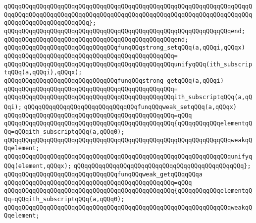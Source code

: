 \verb|qQQqqQQqqQQqqQQqqQQqqQQqqQQqqQQqqQQqqQQqqQQqqQQqqQQqqQQqqQQqqQQqqQQqqQQqqQQqqQQqqQQqqQQqqQQqqQQqqQQqqQQqqQQqqQQqqQQqqQQqqQQqqQQqqQQqqQQqqQQqqQQqqQQqqQQqqQQqqQQqqQQq};|\newline
\verb|qQQqqQQqqQQqqQQqqQQqqQQqqQQqqQQqqQQqqQQqqQQqqQQqqQQqqQQqqQQqqQQqend;|\newline
\verb|qQQqqQQqqQQqqQQqqQQqqQQqqQQqqQQqqQQqqQQqqQQqqQQqend;|\newline
\newline
\verb|qQQqqQQqqQQqqQQqqQQqqQQqqQQqqQQqfunqQQqstrong_setqQQq(a,qQQqi,qQQqx)|\newline
\verb|qQQqqQQqqQQqqQQqqQQqqQQqqQQqqQQqqQQqqQQqqQQqqQQq=|\newline
\verb|qQQqqQQqqQQqqQQqqQQqqQQqqQQqqQQqqQQqqQQqqQQqqQQqunifyqQQq(ith_subscriptqQQq(a,qQQqi),qQQqx);|\newline
\newline
\verb|qQQqqQQqqQQqqQQqqQQqqQQqqQQqqQQqfunqQQqstrong_getqQQq(a,qQQqi)|\newline
\verb|qQQqqQQqqQQqqQQqqQQqqQQqqQQqqQQqqQQqqQQqqQQqqQQq=|\newline
\verb|qQQqqQQqqQQqqQQqqQQqqQQqqQQqqQQqqQQqqQQqqQQqqQQqith_subscriptqQQq(a,qQQqi);|\newline
\newline
\verb|qQQqqQQqqQQqqQQqqQQqqQQqqQQqqQQqfunqQQqweak_setqQQq(a,qQQqx)|\newline
\verb|qQQqqQQqqQQqqQQqqQQqqQQqqQQqqQQqqQQqqQQqqQQqqQQq=qQQq|\newline
\verb|qQQqqQQqqQQqqQQqqQQqqQQqqQQqqQQqqQQqqQQqqQQqqQQq{qQQqqQQqqQQqelementqQQq=qQQqith_subscriptqQQq(a,qQQq0);|\newline
\verb|qQQqqQQqqQQqqQQqqQQqqQQqqQQqqQQqqQQqqQQqqQQqqQQqqQQqqQQqqQQqqQQqweakqQQqelement;|\newline
\verb|qQQqqQQqqQQqqQQqqQQqqQQqqQQqqQQqqQQqqQQqqQQqqQQqqQQqqQQqqQQqqQQqunifyqQQq(element,qQQqx);|\newline
\verb|qQQqqQQqqQQqqQQqqQQqqQQqqQQqqQQqqQQqqQQqqQQqqQQq};|\newline
\newline
\verb|qQQqqQQqqQQqqQQqqQQqqQQqqQQqqQQqfunqQQqweak_getqQQqqQQqa|\newline
\verb|qQQqqQQqqQQqqQQqqQQqqQQqqQQqqQQqqQQqqQQqqQQqqQQq=qQQq|\newline
\verb|qQQqqQQqqQQqqQQqqQQqqQQqqQQqqQQqqQQqqQQqqQQqqQQq{qQQqqQQqqQQqelementqQQq=qQQqith_subscriptqQQq(a,qQQq0);|\newline
\verb|qQQqqQQqqQQqqQQqqQQqqQQqqQQqqQQqqQQqqQQqqQQqqQQqqQQqqQQqqQQqqQQqweakqQQqelement;|\newline
